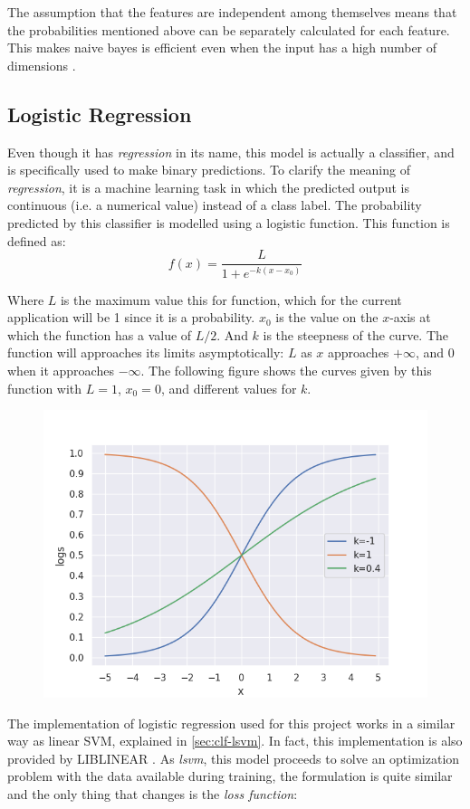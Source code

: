 \documentclass[epsfig,a4paper,11pt,titlepage,twoside,openany]{book}
\begin{document}
The assumption that the features are independent among themselves means that the probabilities mentioned above can be separately calculated for each feature. This makes naive bayes is efficient even when the input has a high number of dimensions \cite{zhang2004_bayes_optimality}.



\subsection{Logistic Regression}
\label{sec:clf-lr}

Even though it has \textit{regression} in its name, this model is actually a classifier, and is specifically used to make binary predictions. To clarify the meaning of \textit{regression}, it is a machine learning task in which the predicted output is continuous (i.e. a numerical value) instead of a class label. The probability predicted by this classifier is modelled using a logistic function. This function is defined as:
\begin{equation*}
    f(x) = \frac{L}{1 + e^{-k(x-x_0)}}
\end{equation*}

Where $L$ is the maximum value this for function, which for the current application will be 1 since it is a probability. $x_0$ is the value on the $x$-axis at which the function has a value of $L/2$. And $k$ is the steepness of the curve. The function will approaches its limits asymptotically: $L$ as $x$ approaches $+ \infty$, and 0 when it approaches $- \infty$. The following figure shows the curves given by this function with $L=1$, $x_0=0$, and different values for $k$.

\begin{figure}[H]
  \centering \includegraphics[width=.5\textwidth]{logistic_function} 
\end{figure}

The implementation of logistic regression used for this project works in a similar way as linear SVM, explained in \autoref{sec:clf-lsvm}. In fact, this implementation is also provided by LIBLINEAR \cite{Fan:2008_liblinear}. As \textit{lsvm}, this model proceeds to solve an optimization problem with the data available during training, the formulation is quite similar and the only thing that changes is the \textit{loss function}:
\end{document}
